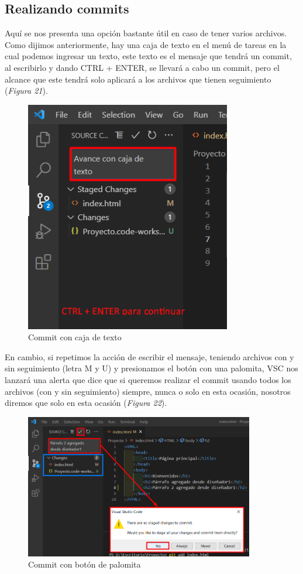 \subsection{Realizando commits}
\hspace{0.55cm}Aquí se nos presenta una opción bastante útil en caso de tener varios archivos. Como dijimos anteriormente, hay una caja de texto en el menú de tareas en la cual podemos ingresar un texto, este texto es el mensaje que tendrá un commit, al escribirlo y dando CTRL + ENTER, se llevará a cabo un commit, pero el alcance que este tendrá solo aplicará a los archivos que tienen seguimiento (\textit{Figura 21}).
\begin{figure}[H]
    \begin{center}
        \caption{Commit con caja de texto}
        \label{fig: 21}
        \includegraphics[width=9cm]{capturas/commits1.png}
    \end{center}
\end{figure}

En cambio, si repetimos la acción de escribir el mensaje, teniendo archivos con y sin seguimiento (letra M y U) y presionamos el botón con una palomita, VSC nos lanzará una alerta que dice que si queremos realizar el commit usando todos los archivos (con y sin seguimiento) siempre, nunca o solo en esta ocasión, nosotros diremos que solo en esta ocasión (\textit{Figura 22}).
\begin{figure}[H]
    \begin{center}
        \caption{Commit con botón de palomita}
        \label{fig: 22}
        \includegraphics[width=10cm]{capturas/commits2.png}
    \end{center}
\end{figure}


